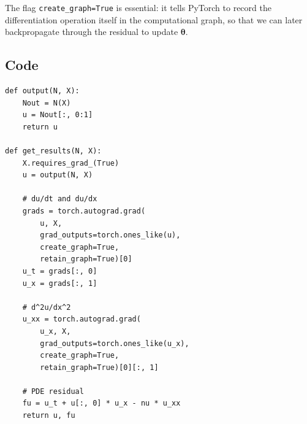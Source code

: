 \documentclass[11pt,a4paper]{article}
\begin{document}

The flag \texttt{create\_graph=True} is essential: it tells PyTorch to
record the differentiation operation itself in the computational graph, so
that we can later backpropagate through the residual to update $\bm\theta$.

\subsection*{Code}

\begin{lstlisting}
def output(N, X):
    Nout = N(X)
    u = Nout[:, 0:1]
    return u

def get_results(N, X):
    X.requires_grad_(True)
    u = output(N, X)

    # du/dt and du/dx
    grads = torch.autograd.grad(
        u, X,
        grad_outputs=torch.ones_like(u),
        create_graph=True,
        retain_graph=True)[0]
    u_t = grads[:, 0]
    u_x = grads[:, 1]

    # d^2u/dx^2
    u_xx = torch.autograd.grad(
        u_x, X,
        grad_outputs=torch.ones_like(u_x),
        create_graph=True,
        retain_graph=True)[0][:, 1]

    # PDE residual
    fu = u_t + u[:, 0] * u_x - nu * u_xx
    return u, fu
\end{lstlisting}
\end{document}
